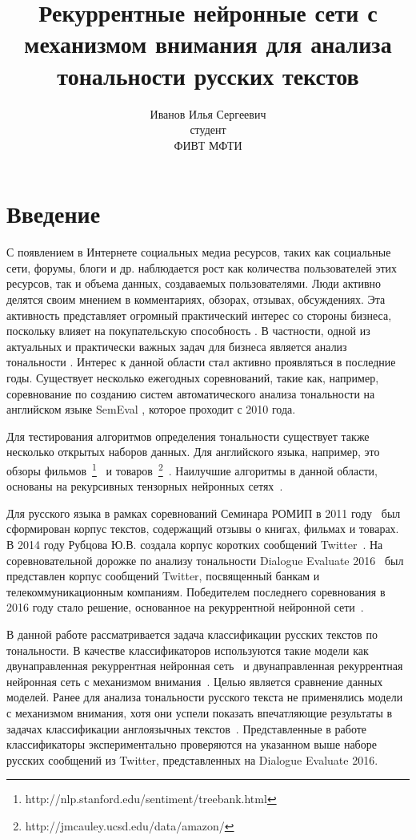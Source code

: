 \documentclass[12pt]{article}
\title{\bf{Рекуррентные нейронные сети с механизмом внимания для анализа тональности русских текстов}}
\author{Иванов Илья Сергеевич\\студент\\ФИВТ МФТИ}
\date{}
\begin{document}
\maketitle

\section{Введение}
С появлением в Интернете социальных медиа ресурсов, таких как социальные сети, форумы, блоги и др. наблюдается рост как количества пользователей этих ресурсов, так и объема данных, создаваемых пользователями. Люди активно делятся своим мнением в комментариях, обзорах, отзывах, обсуждениях. Эта активность представляет огромный практический интерес со стороны бизнеса, поскольку влияет на покупательскую способность \cite{wang}. В частности, одной из актуальных и практически важных задач для бизнеса является анализ тональности \cite{mokoron2012}. Интерес к данной области стал активно проявляться в последние годы. Существует несколько ежегодных соревнований, такие как, например, соревнование по созданию систем автоматического анализа тональности на английском языке SemEval \cite{semeval2010}, которое проходит с 2010 года.

Для тестирования алгоритмов определения тональности существует также несколько открытых наборов данных. Для английского языка, например, это обзоры фильмов~\footnote{http://nlp.stanford.edu/sentiment/treebank.html}~\cite{imdb, socher-rdm} и товаров~\footnote{http://jmcauley.ucsd.edu/data/amazon/}~\cite{amazon}. Наилучшие алгоритмы в данной области, основаны на рекурсивных тензорных нейронных сетях~\cite{socher-rdm}.

Для русского языка в рамках соревнований Семинара РОМИП в 2011 году~\cite{romip} был сформирован корпус текстов, содержащий отзывы о книгах, фильмах и товарах. В 2014 году Рубцова Ю.В. создала корпус коротких сообщений Twitter~\cite{mokoron2015}.
На соревновательной дорожке по анализу тональности Dialogue Evaluate 2016~\cite{senti-ru-eval} был представлен корпус сообщений Twitter, посвященный банкам и телекоммуникационным компаниям. Победителем последнего соревнования в 2016 году стало решение, основанное на рекуррентной нейронной сети~\cite{arhipenko}.

В данной работе рассматривается задача классификации русских текстов по тональности. В качестве классификаторов используются такие модели как двунаправленная рекуррентная нейронная сеть~\cite{schuster} и двунаправленная рекуррентная нейронная сеть с механизмом внимания~\cite{bahdanau}. Целью является сравнение данных моделей. Ранее для анализа тональности русского текста не применялись модели с механизмом внимания, хотя они успели показать впечатляющие результаты в задачах классификации англоязычных текстов~\cite{yang-att-2016}. Представленные в работе классификаторы экспериментально проверяются на указанном выше наборе русских сообщений из Twitter, представленных на Dialogue Evaluate 2016.
\end{document}
